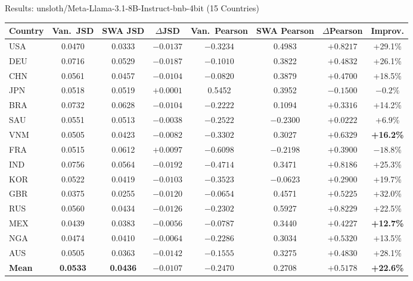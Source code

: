 \documentclass[11pt, aspectratio=169]{beamer}
\begin{document}
\begin{frame}{Results: unsloth/Meta-Llama-3.1-8B-Instruct-bnb-4bit (15 Countries)}

\begin{table}
\centering
\scriptsize
\renewcommand{\arraystretch}{1.05}
\begin{tabular}{@{}l cc c cc c c@{}}
\toprule
\textbf{Country} & \textbf{Van.\ JSD} & \textbf{SWA JSD} & \textbf{$\Delta$JSD} & \textbf{Van.\ Pearson} & \textbf{SWA Pearson} & \textbf{$\Delta$Pearson} & \textbf{Improv.} \\
\midrule
USA & 0.0470 & 0.0333 & $-0.0137$ & $-0.3234$ & 0.4983 & $+0.8217$ & \textcolor{cbGreen}{+29.1\%} \\
DEU & 0.0716 & 0.0529 & $-0.0187$ & $-0.1010$ & 0.3822 & $+0.4832$ & \textcolor{cbGreen}{+26.1\%} \\
CHN & 0.0561 & 0.0457 & $-0.0104$ & $-0.0820$ & 0.3879 & $+0.4700$ & \textcolor{cbGreen}{+18.5\%} \\
JPN & 0.0518 & 0.0519 & \textcolor{alertred}{$+0.0001$} & 0.5452 & 0.3952 & \textcolor{alertred}{$-0.1500$} & \textcolor{alertred}{$-0.2\%$} \\
BRA & 0.0732 & 0.0628 & $-0.0104$ & $-0.2222$ & 0.1094 & $+0.3316$ & \textcolor{cbGreen}{+14.2\%} \\
SAU & 0.0551 & 0.0513 & $-0.0038$ & $-0.2522$ & $-0.2300$ & $+0.0222$ & \textcolor{cbGreen}{+6.9\%} \\
\rowcolor{lightgray}
VNM & 0.0505 & 0.0423 & $-0.0082$ & $-0.3302$ & 0.3027 & $+0.6329$ & \textcolor{cbGreen}{\textbf{+16.2\%}} \\
FRA & 0.0515 & 0.0612 & \textcolor{alertred}{$+0.0097$} & $-0.6098$ & $-0.2198$ & $+0.3900$ & \textcolor{alertred}{$-18.8\%$} \\
IND & 0.0756 & 0.0564 & $-0.0192$ & $-0.4714$ & 0.3471 & $+0.8186$ & \textcolor{cbGreen}{+25.3\%} \\
KOR & 0.0522 & 0.0419 & $-0.0103$ & $-0.3523$ & $-0.0623$ & $+0.2900$ & \textcolor{cbGreen}{+19.7\%} \\
GBR & 0.0375 & 0.0255 & $-0.0120$ & $-0.0654$ & 0.4571 & $+0.5225$ & \textcolor{cbGreen}{+32.0\%} \\
RUS & 0.0560 & 0.0434 & $-0.0126$ & $-0.2302$ & 0.5927 & $+0.8229$ & \textcolor{cbGreen}{+22.5\%} \\
\rowcolor{lightgray}
MEX & 0.0439 & 0.0383 & $-0.0056$ & $-0.0787$ & 0.3440 & $+0.4227$ & \textcolor{cbGreen}{\textbf{+12.7\%}} \\
NGA & 0.0474 & 0.0410 & $-0.0064$ & $-0.2286$ & 0.3034 & $+0.5320$ & \textcolor{cbGreen}{+13.5\%} \\
AUS & 0.0505 & 0.0363 & $-0.0142$ & $-0.1555$ & 0.3275 & $+0.4830$ & \textcolor{cbGreen}{+28.1\%} \\
\midrule
\textbf{Mean} & \textbf{0.0533} & \textbf{0.0436} & $\mathbf{-0.0107}$ & $\mathbf{-0.2470}$ & $\mathbf{0.2708}$ & $\mathbf{+0.5178}$ & \textcolor{cbGreen}{\textbf{+22.6\%}} \\
\bottomrule
\end{tabular}
\end{table}

\end{frame}
\end{document}
